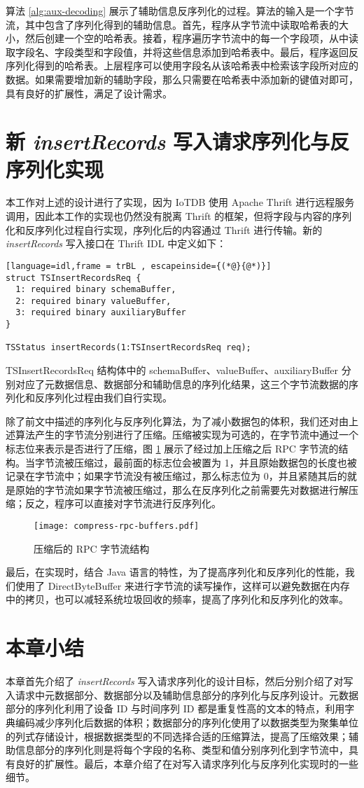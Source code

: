 算法 \ref{alg:aux-decoding} 展示了辅助信息反序列化的过程。算法的输入是一个字节流，其中包含了序列化得到的辅助信息。首先，程序从字节流中读取哈希表的大小，然后创建一个空的哈希表。接着，程序遍历字节流中的每一个字段项，从中读取字段名、字段类型和字段值，并将这些信息添加到哈希表中。最后，程序返回反序列化得到的哈希表。上层程序可以使用字段名从该哈希表中检索该字段所对应的数据。如果需要增加新的辅助字段，那么只需要在哈希表中添加新的键值对即可，具有良好的扩展性，满足了设计需求。

\section{新 \emph{insertRecords} 写入请求序列化与反序列化实现}
本工作对上述的设计进行了实现，因为 IoTDB 使用 Apache Thrift 进行远程服务调用，因此本工作的实现也仍然没有脱离 Thrift 的框架，但将字段与内容的序列化和反序列化过程自行实现，序列化后的内容通过 Thrift 进行传输。新的 \emph{insertRecords} 写入接口在 Thrift IDL 中定义如下：
\begin{lstlisting}[language=idl,frame = trBL , escapeinside={(*@}{@*)}]
struct TSInsertRecordsReq {
  1: required binary schemaBuffer,
  2: required binary valueBuffer,
  3: required binary auxiliaryBuffer
}
  
TSStatus insertRecords(1:TSInsertRecordsReq req);
\end{lstlisting}
TSInsertRecordsReq 结构体中的 schemaBuffer、valueBuffer、auxiliaryBuffer 分别对应了元数据信息、数据部分和辅助信息的序列化结果，这三个字节流数据的序列化和反序列化过程由我们自行实现。

除了前文中描述的序列化与反序列化算法，为了减小数据包的体积，我们还对由上述算法产生的字节流分别进行了压缩。压缩被实现为可选的，在字节流中通过一个标志位来表示是否进行了压缩，图 \ref{fig:compress-rpc-buffers} 展示了经过加上压缩之后 RPC 字节流的结构。当字节流被压缩过，最前面的标志位会被置为 1，并且原始数据包的长度也被记录在字节流中；如果字节流没有被压缩过，那么标志位为 0，并且紧随其后的就是原始的字节流如果字节流被压缩过，那么在反序列化之前需要先对数据进行解压缩；反之，程序可以直接对字节流进行反序列化。

\begin{figure}
  \centering
  \texttt{[image: compress-rpc-buffers.pdf]}
  \caption{压缩后的 RPC 字节流结构}
  \label{fig:compress-rpc-buffers}
\end{figure}

最后，在实现时，结合 Java 语言的特性，为了提高序列化和反序列化的性能，我们使用了 DirectByteBuffer 来进行字节流的读写操作，这样可以避免数据在内存中的拷贝，也可以减轻系统垃圾回收的频率，提高了序列化和反序列化的效率。

\section{本章小结}
本章首先介绍了 \emph{insertRecords} 写入请求序列化的设计目标，然后分别介绍了对写入请求中元数据部分、数据部分以及辅助信息部分的序列化与反序列设计。元数据部分的序列化利用了设备 ID 与时间序列 ID 都是重复性高的文本的特点，利用字典编码减少序列化后数据的体积；数据部分的序列化使用了以数据类型为聚集单位的列式存储设计，根据数据类型的不同选择合适的压缩算法，提高了压缩效果；辅助信息部分的序列化则是将每个字段的名称、类型和值分别序列化到字节流中，具有良好的扩展性。最后，本章介绍了在对写入请求序列化与反序列化实现时的一些细节。